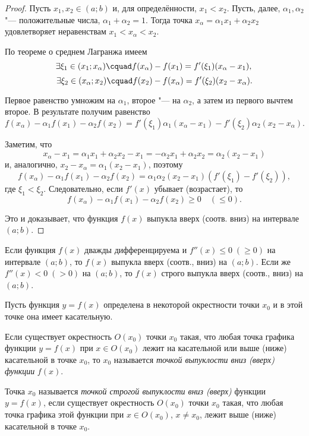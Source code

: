 \begin{proof}
Пусть $x_1,x_2\in(a;b)$ и, для определённости, $x_1<x_2$. Пусть, далее, $\alpha_1, \alpha_2$ "--- положительные числа, $\alpha_1+\alpha_2=1$. Тогда точка $x_\alpha=\alpha_1x_1+\alpha_2x_2$ удовлетворяет неравенствам $x_1<x_\alpha<x_2$.

По теореме о среднем Лагранжа имеем
$$
\exists \xi_1\in(x_1;x_\alpha)\cquad f(x_\alpha)-f(x_1)=f'(\xi_1)(x_\alpha-x_1),\\
$$
$$
\exists \xi_2\in(x_\alpha;x_2)\cquad f(x_2)-f(x_\alpha)=f'(\xi_2)(x_2-x_\alpha).
$$

Первое равенство умножим на $\alpha_1$, второе  "--- на $\alpha_2$, а затем из первого вычтем второе. В результате получим равенство
$$
f(x_\alpha)-\alpha_1f(x_1)-\alpha_2f(x_2)=f'(\xi_1)\alpha_1(x_\alpha-x_1)-f'(\xi_2)\alpha_2(x_2-x_\alpha).
$$

Заметим, что 
$$
x_\alpha-x_1=\alpha_1x_1+\alpha_2x_2-x_1=-\alpha_2x_1+\alpha_2x_2=\alpha_2(x_2-x_1)
$$
и, аналогично, $x_2-x_\alpha=\alpha_1(x_2-x_1)$, поэтому
$$
f(x_\alpha)-\alpha_1f(x_1)-\alpha_2f(x_2)=\alpha_1\alpha_2(x_2-x_1)(f'(\xi_1)-f'(\xi_2)),
$$
где $\xi_1<\xi_2$. Следовательно, если $f'(x)$ убывает (возрастает), то 
$$
f(x_\alpha)-\alpha_1f(x_1)-\alpha_2f(x_2)\ge 0 \quad(\le 0).
$$

Это и доказывает, что функция $f(x)$ выпукла вверх (соотв. вниз) на интервале $(a;b)$.
\end{proof}
\begin{cons}
Если функция $f(x)$ дважды дифференцируема и $f''(x)\le 0\;(\ge 0)$ на интервале $(a;b)$, то $f(x)$ выпукла вверх (соотв., вниз) на $(a;b)$. Если же $f''(x)<0\;(>0)$ на $(a;b)$, то $f(x)$ строго выпукла вверх (соотв., вниз) на $(a;b)$.
\end{cons}


Пусть функция $y=f(x)$ определена в некоторой окрестности точки $x_0$ и в этой точке она имеет касательную.

\begin{defn}
Если существует окрестность $O(x_0)$ точки $x_0$ такая, что любая точка графика функции $y=f(x)$ при $x\in O(x_0)$ лежит на касательной или выше (ниже) касательной в точке $x_0$, то $x_0$ называется \textit{точкой выпуклости вниз (вверх) функции} $f(x)$.
\end{defn}

\begin{defn}
Точка $x_0$ называется \textit{точкой строгой выпуклости вниз (вверх)} функции $y=f(x)$, если существует окрестность $O(x_0)$ точки $x_0$ такая, что любая точка графика этой функции при $x\in O(x_0)$, $x\neq x_0$, лежит выше (ниже) касательной в точке $x_0$.
\end{defn}


